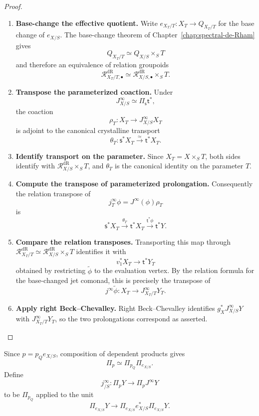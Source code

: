 \begin{proof}
\leavevmode
\begin{enumerate}[label=\textup{(\arabic*)}]
    \item \textbf{Base-change the effective quotient.}
Write \(e_{X_T/T}:X_T\to Q_{X_T/T}\) for the base change of \(e_{X/S}\). The
base-change theorem of Chapter~\ref{chap:spectral-de-Rham} gives
\[
  Q_{X_T/T}\simeq Q_{X/S}\times_ST
\]
and therefore an equivalence of relation groupoids
\[
  \mathcal R^{\mathrm{dR}}_{X_T/T,\bullet}
  \simeq
  \mathcal R^{\mathrm{dR}}_{X/S,\bullet}\times_ST.
\]

    \item \textbf{Transpose the parameterized coaction.}
Under
\[
  J^\infty_{X/S}\simeq\Pi_{\mathsf s}\mathsf t^*,
\]
the coaction
\[
  \rho_T:X_T\to J^\infty_{X/S}X_T
\]
is adjoint to the canonical crystalline transport
\[
  \theta_T:\mathsf s^*X_T\xrightarrow{\simeq}\mathsf t^*X_T.
\]

    \item \textbf{Identify transport on the parameter.}
Since \(X_T=X\times_ST\), both sides identify with
\(\mathcal R^{\mathrm{dR}}_{X/S}\times_ST\), and \(\theta_T\) is the canonical identity on the
parameter \(T\).

    \item \textbf{Compute the transpose of parameterized prolongation.}
Consequently the relation transpose of
\[
  j_T^\infty\phi=J^\infty(\phi)\rho_T
\]
is
\[
  \mathsf s^*X_T
  \xrightarrow{\theta_T}
  \mathsf t^*X_T
  \xrightarrow{\mathsf t^*\phi}
  \mathsf t^*Y.
\]

    \item \textbf{Compare the relation transposes.}
Transporting this map through
\(\mathcal R^{\mathrm{dR}}_{X_T/T}\simeq \mathcal R^{\mathrm{dR}}_{X/S}\times_ST\) identifies it with
\[
  v_1^*X_T
  \longrightarrow
  \mathsf t^*Y_T
\]
obtained by restricting \(\widetilde\phi\) to the evaluation vertex. By the
relation formula for the base-changed jet comonad, this is precisely the
transpose of
\[
  j^\infty\widetilde\phi:
  X_T\to J^\infty_{X_T/T}Y_T.
\]

    \item \textbf{Apply right Beck--Chevalley.}
Right Beck--Chevalley identifies
\(g_X^*J^\infty_{X/S}Y\) with
\(J^\infty_{X_T/T}Y_T\), so the two prolongations correspond as asserted.
\end{enumerate}
\end{proof}

\begin{construction}
Since \(p=p_Qe_{X/S}\), composition of dependent products gives
\[
  \Pi_p\simeq\Pi_{p_Q}\Pi_{e_{X/S}}.
\]
Define
\[
  j^\infty_{/S}:
  \Pi_pY\longrightarrow\Pi_pJ^\infty Y
\]
to be \(\Pi_{p_Q}\) applied to the unit
\[
  \Pi_{e_{X/S}} Y
  \longrightarrow
  \Pi_{e_{X/S}}e_{X/S}^*\Pi_{e_{X/S}} Y.
\]
\end{construction}

